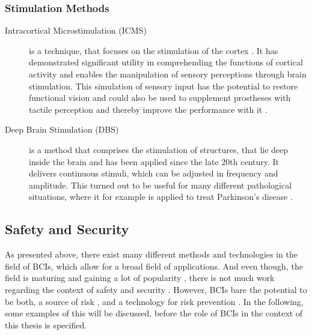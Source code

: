         \subsubsection{Stimulation Methods}
        \begin{description}
            \item[Intracortical Microstimulation (ICMS)] is a technique, that focuses on the stimulation of the cortex \cite{Vidal.2016}. It has demonstrated significant utility in comprehending the functions of cortical activity and enables the manipulation of sensory perceptions through brain stimulation. This simulation of sensory input has the potential to restore functional vision \cite{Zhao.2023} and could also be used to supplement prostheses with tactile perception and thereby improve the performance with it \cite{Flesher.2021}.
            \item[Deep Brain Stimulation (DBS)] is a method that comprises the stimulation of structures, that lie deep inside the brain and has been applied since the late 20th century. It delivers continuous stimuli, which can be adjusted in frequency and amplitude. This turned out to be useful for many different pathological situations, where it for example is applied to treat Parkinson's disease \cite{Benabid.2003}.
        \end{description}


    \subsection{Safety and Security}
    As presented above, there exist many different methods and technologies in the field of BCIs, which allow for a broad field of applications. And even though, the field is maturing \cite{Summerer.2009} and gaining a lot of popularity \cite{Bernal.2023}, there is not much work regarding the context of safety and security \cite{Brocal.2023}. However, BCIs bare the potential to be both, a source of risk \cite{Bernal.2021}, and a technology for risk prevention \cite{Liu.2015}. In the following, some examples of this will be discussed, before the role of BCIs in the context of this thesis is specified. 

